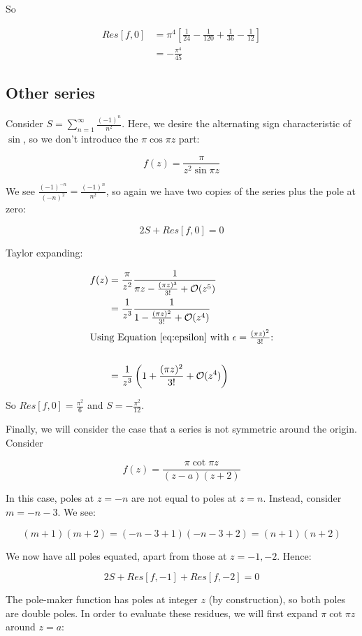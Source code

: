 \documentclass{../../physics_notes}
\begin{document}
So 

\begin{align*}
	Res[f,0] &= \pi^4 \left[\frac{1}{24} - \frac{1}{120} + \frac{1}{36} - \frac{1}{12}\right] \\
	&= -\frac{\pi^4}{45}
\end{align*}

\subsection{Other series}

Consider $S = \sum_{n=1}^\infty \frac{(-1)^n}{n^2}$. Here, we desire the alternating sign characteristic of $\sin{}$, so we don't introduce the $\pi\cos{\pi z}$ part:

\[ f(z) = \frac{\pi}{z^2\sin{\pi z}} \]

We see $\frac{(-1)^{-n}}{(-n)^2} = \frac{(-1)^n}{n^2}$, so again we have two copies of the series plus the pole at zero:

\[ 2S + Res[f,0] = 0 \]

Taylor expanding:

\begin{align*}
	f(z) &= \frac{\pi}{z^2} \frac{1}{\pi z - \frac{(\pi z)^3}{3!} + \mathcal{O}(z^5)} \\
	&= \frac{1}{z^3} \frac{1}{1 - \frac{(\pi z)^2}{3!} + \mathcal{O}(z^4)} \\
	\intertext{Using Equation \ref{eq:epsilon} with $\epsilon = \frac{(\pi z)^2}{3!}$:} \\
	&= \frac{1}{z^3}\left(1 + \frac{(\pi z)^2}{3!} + \mathcal{O}(z^4)\right)
\end{align*}

So $Res[f,0] = \frac{\pi^2}{6}$ and $S = -\frac{\pi^2}{12}$. 

Finally, we will consider the case that a series is not symmetric around the origin. Consider 

\[ f(z) = \frac{\pi\cot{\pi z}}{(z-a)(z+2)} \]

In this case, poles at $z = -n$ are not equal to poles at $z = n$. Instead, consider $m = -n-3$. We see:

\[ (m+1)(m+2) = (-n-3+1)(-n-3+2) = (n+1)(n+2) \]

We now have all poles equated, apart from those at $z=-1, -2$. Hence:

\[ 2S + Res[f,-1] + Res[f,-2] = 0 \]

The pole-maker function has poles at integer $z$ (by construction), so both poles are double poles. In order to evaluate these residues, we will first expand $\pi \cot{\pi z}$ around $z = a$:
\end{document}

